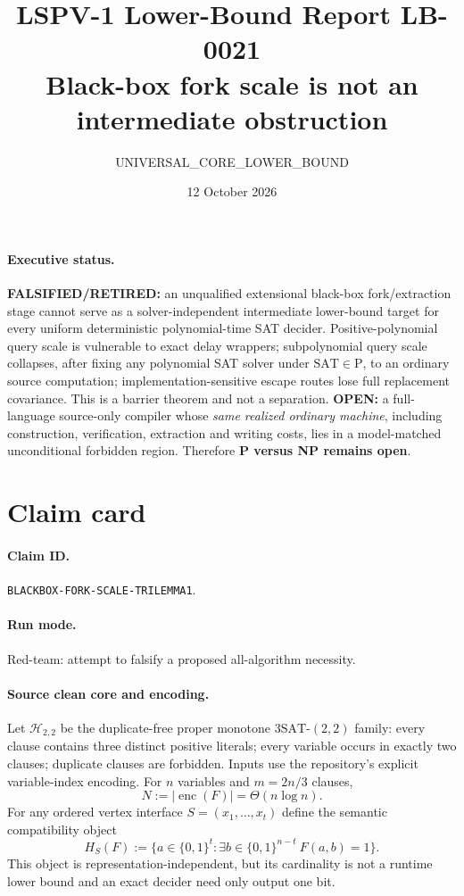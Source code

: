 \documentclass[11pt]{article}
\title{LSPV-1 Lower-Bound Report LB-0021\\Black-box fork scale is not an intermediate obstruction}
\author{UNIVERSAL\_CORE\_LOWER\_BOUND}
\date{12 October 2026}
\newcommand{\SAT}{\mathrm{SAT}}
\newcommand{\Hcore}{\mathcal H_{2,2}}
\begin{document}
\maketitle

\paragraph{Executive status.}
\textbf{FALSIFIED/RETIRED:} an unqualified extensional black-box
fork/extraction stage cannot serve as a solver-independent intermediate
lower-bound target for every uniform deterministic polynomial-time SAT
decider.  Positive-polynomial query scale is vulnerable to exact delay
wrappers; subpolynomial query scale collapses, after fixing any polynomial
SAT solver under $\SAT\in\mathrm P$, to an ordinary source computation;
implementation-sensitive escape routes lose full replacement covariance.
This is a barrier theorem and not a separation.  \textbf{OPEN:} a
full-language source-only compiler whose \emph{same realized ordinary
machine}, including construction, verification, extraction and writing
costs, lies in a model-matched unconditional forbidden region.  Therefore
\textbf{P versus NP remains open}.

\section{Claim card}

\paragraph{Claim ID.}
\texttt{BLACKBOX-FORK-SCALE-TRILEMMA1}.

\paragraph{Run mode.}
Red-team: attempt to falsify a proposed all-algorithm necessity.

\paragraph{Source clean core and encoding.}
Let $\Hcore$ be the duplicate-free proper monotone
$\mathrm{3SAT}\text{-}(2,2)$ family: every clause contains three distinct
positive literals; every variable occurs in exactly two clauses; duplicate
clauses are forbidden.  Inputs use the repository's explicit variable-index
encoding.  For $n$ variables and $m=2n/3$ clauses,
\[
        N:=|\operatorname{enc}(F)|=\Theta(n\log n).
\]
For any ordered vertex interface $S=(x_1,\ldots,x_t)$ define the semantic
compatibility object
\[
 H_S(F):=\{a\in\{0,1\}^{t}:\exists b\in\{0,1\}^{n-t}\ F(a,b)=1\}.
\]
This object is representation-independent, but its cardinality is not a
runtime lower bound and an exact decider need only output one bit.
\end{document}
